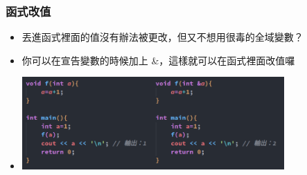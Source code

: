 \documentclass[mathserif]{beamer}
\begin{document}
\begin{frame}
    \frametitle{函式改值}
    \begin{itemize}
        \item 丟進函式裡面的值沒有辦法被更改，但又不想用很毒的全域變數？
        \item 你可以在宣告變數的時候加上 \&，這樣就可以在函式裡面改值囉
        \vspace{0.5cm}
        \item \includegraphics[width=10.0cm]{img/code_3.png}
    \end{itemize}
\end{frame}
\end{document}
